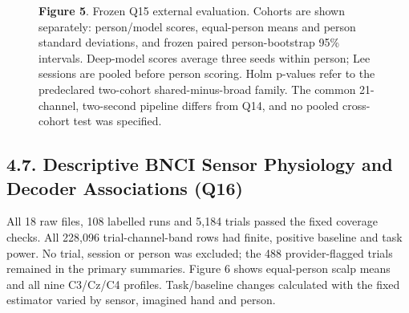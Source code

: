 \documentclass[11pt]{article}
\begin{document}
\begin{figure}[htbp]
{
}
\caption*{\textbf{Figure 5}. Frozen Q15 external evaluation. Cohorts are shown separately: person/model scores, equal-person means and person standard deviations, and frozen paired person-bootstrap 95\% intervals. Deep-model scores average three seeds within person; Lee sessions are pooled before person scoring. Holm p-values refer to the predeclared two-cohort shared-minus-broad family. The common 21-channel, two-second pipeline differs from Q14, and no pooled cross-cohort test was specified.}
\end{figure}
\subsection*{4.7. Descriptive BNCI Sensor Physiology and Decoder Associations (Q16)}
All 18 raw files, 108 labelled runs and 5,184 trials passed the fixed coverage checks. All 228,096 trial-channel-band rows had finite, positive baseline and task power. No trial, session or person was excluded; the 488 provider-flagged trials remained in the primary summaries. Figure 6 shows equal-person scalp means and all nine C3/Cz/C4 profiles. Task/baseline changes calculated with the fixed estimator varied by sensor, imagined hand and person.
\end{document}
